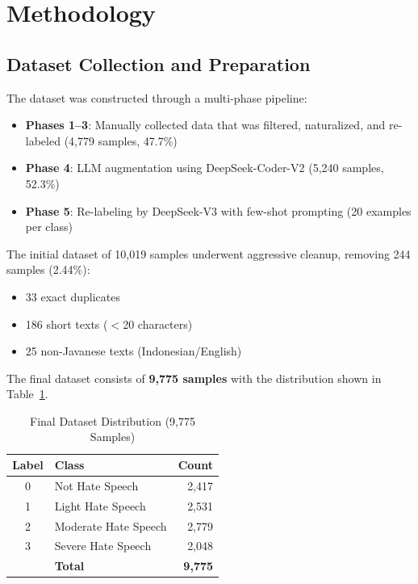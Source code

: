 \documentclass[10pt,twocolumn]{article}
\begin{document}
\section{Methodology}

\subsection{Dataset Collection and Preparation}

The dataset was constructed through a multi-phase pipeline:
\begin{itemize}[leftmargin=*,nosep]
    \item \textbf{Phases 1--3}: Manually collected data that was filtered, naturalized, and re-labeled (4,779 samples, 47.7\%)
    \item \textbf{Phase 4}: LLM augmentation using DeepSeek-Coder-V2 (5,240 samples, 52.3\%)
    \item \textbf{Phase 5}: Re-labeling by DeepSeek-V3 with few-shot prompting (20 examples per class)
\end{itemize}

The initial dataset of 10,019 samples underwent aggressive cleanup, removing 244 samples (2.44\%):
\begin{itemize}[leftmargin=*,nosep]
    \item 33 exact duplicates
    \item 186 short texts ($<$20 characters)
    \item 25 non-Javanese texts (Indonesian/English)
\end{itemize}

The final dataset consists of \textbf{9,775 samples} with the distribution shown in Table~\ref{tab:dataset}.

\begin{table}[H]
\centering
\caption{Final Dataset Distribution (9,775 Samples)}
\label{tab:dataset}
\begin{tabular}{clr}
\toprule
\textbf{Label} & \textbf{Class} & \textbf{Count} \\
\midrule
0 & Not Hate Speech & 2,417 \\
1 & Light Hate Speech & 2,531 \\
2 & Moderate Hate Speech & 2,779 \\
3 & Severe Hate Speech & 2,048 \\
\midrule
  & \textbf{Total} & \textbf{9,775} \\
\bottomrule
\end{tabular}
\end{table}
\end{document}

